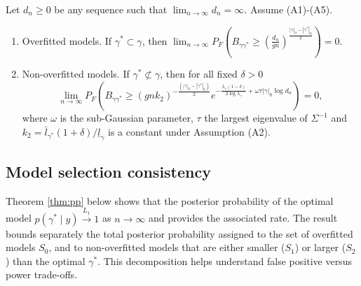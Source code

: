 \begin{theorem}
Let $d_n\geq 0$ be any sequence such that $\lim_{n \rightarrow \infty} d_n= \infty$. Assume (A1)-(A5).
\begin{enumerate}[leftmargin=*,label=(\roman*)]
\item Overfitted models. If $\gamma^* \subset \gamma$, then
$\lim_{n \rightarrow \infty} P_F \left( B_{\gamma \gamma^*} \geq  \left( \frac{d_n}{gn} \right)^{\frac{|\gamma|_0 - |\gamma^*|_0}{2}} \right)= 0.$

\item Non-overfitted models. If $\gamma^* \not\subset \gamma$, then for all fixed $\delta>0$
$$
\lim_{n \rightarrow \infty} 
P_F \left( B_{\gamma \gamma^*} \geq \left( gnk_2 \right)^{-\frac{(|\gamma|_0-|\gamma^*|_0)}{2}} e^{-\frac{\lambda_\gamma (1-\delta)}{2 \log \lambda_\gamma} + \omega \tau |\gamma|_0 \log d_n} \right)= 0,
$$
where $\omega$ is the sub-Gaussian parameter, $\tau$ the largest eigenvalue of $\Sigma^{-1}$
and $k_2= \bar{l}_{\gamma^*} (1+\delta) / \underline{l}_\gamma$ is a constant under Assumption (A2).
\end{enumerate}
\label{thm:bf}
\end{theorem}



\subsection{Model selection consistency}
\label{ssec:pp}


Theorem \ref{thm:pp} below shows that the posterior probability of the optimal model $p(\gamma^* \mid y) \stackrel{L_1}{\longrightarrow} 1$ as $n \rightarrow \infty$ and provides the associated rate.
The result bounds separately the total posterior probability assigned to the set of overfitted models $S_0$,
and to non-overfitted models that are either smaller ($S_1$) or larger ($S_2$) than the optimal $\gamma^*$. This decomposition helps understand false positive versus power trade-offs.

